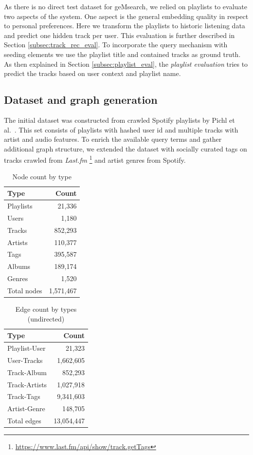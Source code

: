 \documentclass[sigconf]{acmart}
\begin{document}
As there is no direct test dataset for geMsearch, we relied on playlists to evaluate two aspects of the system. One aspect is the general embedding quality in respect to personal preferences. Here we transform the playlists to historic listening data and predict one hidden track per user. This evaluation is further described in Section \ref{subsec:track_rec_eval}. To incorporate the query mechanism with seeding elements we use the playlist title and contained tracks as ground truth. As then explained in Section \ref{subsec:playlist_eval}, the \emph{playlist evaluation} tries to predict the tracks based on user context and playlist name.


\subsection{Dataset and graph generation}
The initial dataset was constructed from crawled Spotify playlists by Pichl et al.~\cite{pichl2017improving}. This set consists of playlists with hashed user id and multiple tracks with artist and audio features. To enrich the available query terms and gather additional graph structure, we extended the dataset with socially curated tags on tracks crawled from \emph{Last.fm} \footnote{\url{https://www.last.fm/api/show/track.getTags}} and artist genres from Spotify.

\begin{table}[H]
	\caption{Node count by type}
	\label{table:node_count}
	\begin{tabular}{lr}
		\midrule 
		\textbf{Type} & \textbf{Count} \\ 
		\midrule 
		Playlists & 21,336  \\
		Users     & 1,180     \\
		Tracks    & 852,293 \\
		Artists   & 110,377  \\
		Tags      & 395,587    \\
		Albums    & 189,174    \\
		Genres	  & 1,520	\\
		\midrule 
		Total nodes & 1,571,467\\
		\bottomrule
	\end{tabular}
\end{table}

\begin{table}[H]
	\caption{Edge count by types (undirected)}
	\label{table:edge_count}
	\begin{tabular}{lr}
		\midrule 
		\textbf{Type} & \textbf{Count} \\ 
		\midrule 
		Playlist-User   & 21,323  \\
		User-Tracks     & 1,662,605     \\
		Track-Album		& 852,293 \\
		Track-Artists   & 1,027,918 \\
		Track-Tags   	& 9,341,603 \\
		Artist-Genre	& 148,705  \\
		\midrule 
		Total edges 	& 13,054,447\\
		\bottomrule
	\end{tabular}
\end{table}
\end{document}
